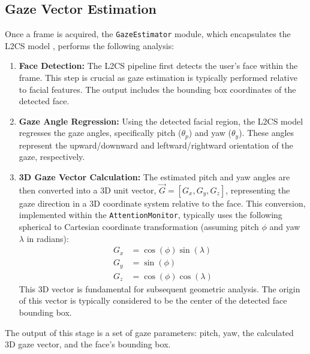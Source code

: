 \subsection{Gaze Vector Estimation}
Once a frame is acquired, the \texttt{GazeEstimator} module, which encapsulates the L2CS model \cite{L2CSNet2022}, performs the following analysis:
\begin{enumerate}
    \item \textbf{Face Detection:} The L2CS pipeline first detects the user's face within the frame. This step is crucial as gaze estimation is typically performed relative to facial features. The output includes the bounding box coordinates of the detected face.
    \item \textbf{Gaze Angle Regression:} Using the detected facial region, the L2CS model regresses the gaze angles, specifically pitch ($\theta_p$) and yaw ($\theta_y$). These angles represent the upward/downward and leftward/rightward orientation of the gaze, respectively.
    \item \textbf{3D Gaze Vector Calculation:} The estimated pitch and yaw angles are then converted into a 3D unit vector, $\vec{G} = [G_x, G_y, G_z]$, representing the gaze direction in a 3D coordinate system relative to the face. This conversion, implemented within the \texttt{AttentionMonitor}, typically uses the following spherical to Cartesian coordinate transformation (assuming pitch $\phi$ and yaw $\lambda$ in radians):
    \begin{equation}
    \begin{aligned}
        G_x &= \cos(\phi) \sin(\lambda) \\
        G_y &= \sin(\phi) \\
        G_z &= \cos(\phi) \cos(\lambda)
    \end{aligned}
    \end{equation}
    This 3D vector is fundamental for subsequent geometric analysis. The origin of this vector is typically considered to be the center of the detected face bounding box.
\end{enumerate}
The output of this stage is a set of gaze parameters: pitch, yaw, the calculated 3D gaze vector, and the face's bounding box.

